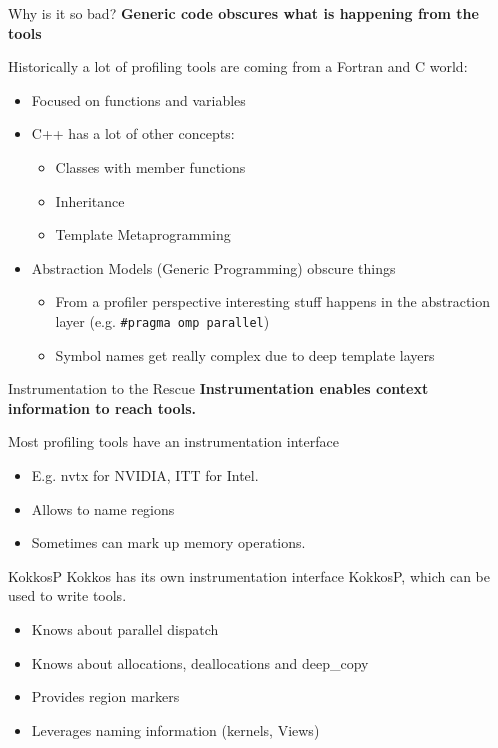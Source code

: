 \begin{frame}[fragile]{Why is it so bad?}
  \textbf{Generic code obscures what is happening from the tools}

  Historically a lot of profiling tools are coming from a Fortran and C world:

  \begin{itemize}
    \item Focused on functions and variables
    \item C++ has a lot of other concepts:
    \begin{itemize}
      \item Classes with member functions
      \item Inheritance
      \item Template Metaprogramming
    \end{itemize}
    \item Abstraction Models (Generic Programming) obscure things
    \begin{itemize}
      \item From a profiler perspective interesting stuff happens in the abstraction layer (e.g. \texttt{\#pragma omp parallel})
      \item Symbol names get really complex due to deep template layers  
    \end{itemize}
  \end{itemize}

\end{frame}


\begin{frame}[fragile]{Instrumentation to the Rescue}
  \textbf{Instrumentation enables context information to reach tools.}

  \vspace{5pt}
  Most profiling tools have an instrumentation interface

  \begin{itemize}
    \item E.g. nvtx for NVIDIA, ITT for Intel.
    \item Allows to name regions
    \item Sometimes can mark up memory operations.
  \end{itemize}

  \pause
  \vspace{5pt}
  \begin{block}{KokkosP}
    Kokkos has its own instrumentation interface KokkosP, which can be used to write tools.
  \end{block}

  \begin{itemize}
    \item Knows about parallel dispatch
    \item Knows about allocations, deallocations and deep\_copy
    \item Provides region markers
    \item Leverages naming information (kernels, Views)
  \end{itemize}

\end{frame}

